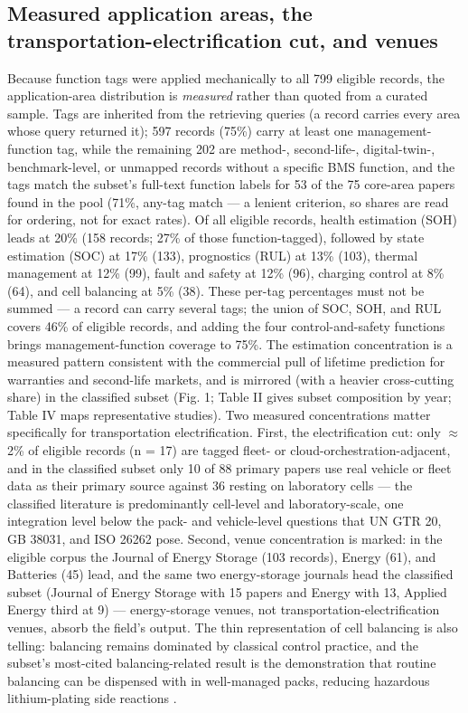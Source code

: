 \documentclass[journal]{IEEEtran}
\begin{document}
\subsection{Measured application areas, the transportation-electrification cut, and venues}

Because function tags were applied mechanically to all 799 eligible records, the application-area distribution is \textit{measured} rather than quoted from a curated sample. Tags are inherited from the retrieving queries (a record carries every area whose query returned it); 597 records (75\%) carry at least one management-function tag, while the remaining 202 are method-, second-life-, digital-twin-, benchmark-level, or unmapped records without a specific BMS function, and the tags match the subset's full-text function labels for 53 of the 75 core-area papers found in the pool (71\%, any-tag match --- a lenient criterion, so shares are read for ordering, not for exact rates). Of all eligible records, health estimation (SOH) leads at 20\% (158 records; 27\% of those function-tagged), followed by state estimation (SOC) at 17\% (133), prognostics (RUL) at 13\% (103), thermal management at 12\% (99), fault and safety at 12\% (96), charging control at 8\% (64), and cell balancing at 5\% (38). These per-tag percentages must not be summed --- a record can carry several tags; the union of SOC, SOH, and RUL covers 46\% of eligible records, and adding the four control-and-safety functions brings management-function coverage to 75\%. The estimation concentration is a measured pattern consistent with the commercial pull of lifetime prediction for warranties and second-life markets, and is mirrored (with a heavier cross-cutting share) in the classified subset (Fig. 1; Table II gives subset composition by year; Table IV maps representative studies). Two measured concentrations matter specifically for transportation electrification. First, the electrification cut: only $\approx$2\% of eligible records (n = 17) are tagged fleet- or cloud-orchestration-adjacent, and in the classified subset only 10 of 88 primary papers use real vehicle or fleet data as their primary source against 36 resting on laboratory cells --- the classified literature is predominantly cell-level and laboratory-scale, one integration level below the pack- and vehicle-level questions that UN GTR 20, GB 38031, and ISO 26262 pose. Second, venue concentration is marked: in the eligible corpus the Journal of Energy Storage (103 records), Energy (61), and Batteries (45) lead, and the same two energy-storage journals head the classified subset (Journal of Energy Storage with 15 papers and Energy with 13, Applied Energy third at 9) --- energy-storage venues, not transportation-electrification venues, absorb the field's output. The thin representation of cell balancing is also telling: balancing remains dominated by classical control practice, and the subset's most-cited balancing-related result is the demonstration that routine balancing can be dispensed with in well-managed packs, reducing hazardous lithium-plating side reactions \cite{r30}.
\end{document}
